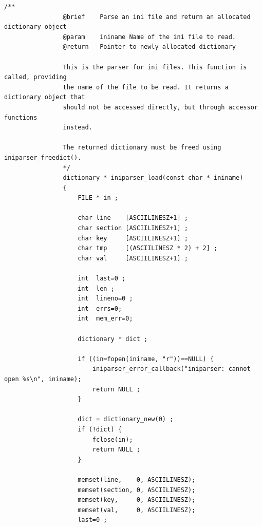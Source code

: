 \documentclass{article}
\begin{document}
\begin{Verbatim}[gobble=8]
                /**
                @brief    Parse an ini file and return an allocated dictionary object
                @param    ininame Name of the ini file to read.
                @return   Pointer to newly allocated dictionary
                
                This is the parser for ini files. This function is called, providing
                the name of the file to be read. It returns a dictionary object that
                should not be accessed directly, but through accessor functions
                instead.
                
                The returned dictionary must be freed using iniparser_freedict().
                */
                dictionary * iniparser_load(const char * ininame)
                {
                    FILE * in ;
                
                    char line    [ASCIILINESZ+1] ;
                    char section [ASCIILINESZ+1] ;
                    char key     [ASCIILINESZ+1] ;
                    char tmp     [(ASCIILINESZ * 2) + 2] ;
                    char val     [ASCIILINESZ+1] ;
                
                    int  last=0 ;
                    int  len ;
                    int  lineno=0 ;
                    int  errs=0;
                    int  mem_err=0;
                
                    dictionary * dict ;
                
                    if ((in=fopen(ininame, "r"))==NULL) {
                        iniparser_error_callback("iniparser: cannot open %s\n", ininame);
                        return NULL ;
                    }
                
                    dict = dictionary_new(0) ;
                    if (!dict) {
                        fclose(in);
                        return NULL ;
                    }
                
                    memset(line,    0, ASCIILINESZ);
                    memset(section, 0, ASCIILINESZ);
                    memset(key,     0, ASCIILINESZ);
                    memset(val,     0, ASCIILINESZ);
                    last=0 ;
                

\end{Verbatim}
\end{document}
